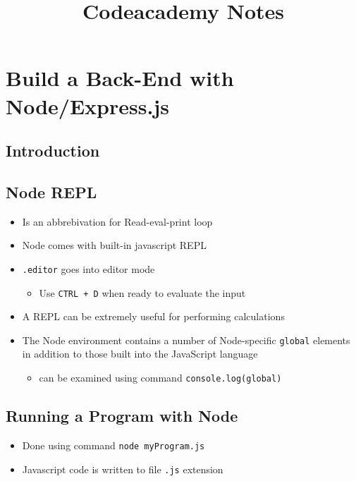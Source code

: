 \documentclass[12pt]{article}
\begin{document}
\title{Codeacademy Notes}

\section{Build a Back-End with Node/Express.js}
\subsection{Introduction}
\subsection{Node REPL}
\begin{itemize}
    \item Is an abbrebivation for Read-eval-print loop
    \item Node comes with built-in javascript REPL
    \item \texttt{.editor} goes into editor mode
    \begin{itemize}
        \item Use \texttt{CTRL + D} when ready to evaluate the input
    \end{itemize}
    \item A REPL can be extremely useful for performing calculations
    \item The Node environment contains a number of Node-specific \texttt{global}
    elements in addition to those built into the JavaScript language
    \begin{itemize}
        \item can be examined using command \texttt{console.log(global)}
    \end{itemize}
\end{itemize}

\subsection{Running a Program with Node}
\begin{itemize}
    \item Done using command \texttt{node myProgram.js}
    \item Javascript code is written to file \texttt{.js} extension
\end{itemize}
\end{document}
